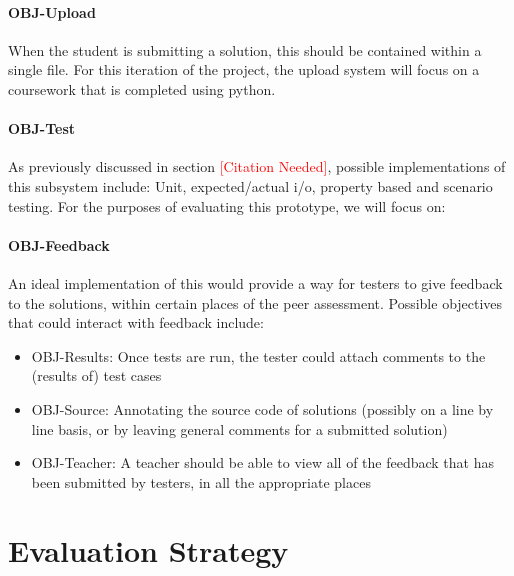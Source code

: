 \documentclass[a4paper,11pt]{report}
\newcommand{\cn}{\textcolor{red}{[Citation Needed]}}
\begin{document}
\subsubsection*{OBJ-Upload}
When the student is submitting a solution, this should be contained within a single file. For this iteration of the project, the upload system will focus on a coursework that is completed using python.
\subsubsection*{OBJ-Test}
As previously discussed in section \cn, possible implementations of this subsystem include: Unit, expected/actual i/o, property based and scenario testing. For the purposes of evaluating this prototype, we will focus on:
\subsubsection*{OBJ-Feedback}
An ideal implementation of this would provide a way for testers to give feedback to the solutions, within certain places of the peer assessment. Possible objectives that could interact with feedback include:
\begin{itemize}
 \item OBJ-Results: Once tests are run, the tester could attach comments to the (results of) test cases
 \item OBJ-Source: Annotating the source code of solutions (possibly on a line by line basis, or by leaving general comments for a submitted solution)
 \item OBJ-Teacher: A teacher should be able to view all of the feedback that has been submitted by testers, in all the appropriate places
\end{itemize}


\chapter{Evaluation Strategy}
\end{document}
